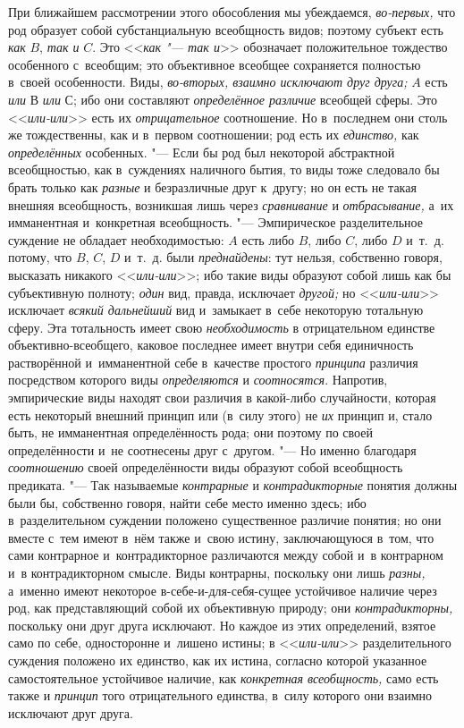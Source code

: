 При ближайшем рассмотрении этого обособления мы убеждаемся,
{\em во-первых,} что род
образует собой субстанциальную всеобщность видов; поэтому субъект есть
{\em как} $B$, {\em так и} $C$. Это <<{\em как "--- так и}>>
обозначает положительное тождество особенного с~всеобщим; это
объективное всеобщее сохраняется полностью в~своей особенности. Виды,
{\em во-вторых, взаимно исключают друг друга;} $A$ есть
{\em или} $В$ {\em или} $С$; ибо они составляют {\em определённое
различие} всеобщей сферы. Это <<{\em или-или}>> есть их {\em отрицательное}
соотношение. Но в~последнем они столь же тождественны, как и
в~первом соотношении; род есть их {\em единство,} как {\em определённых}
особенных. "--- Если бы род был некоторой
абстрактной всеобщностью, как в~суждениях наличного бытия, то виды тоже
следовало бы брать только как {\em разные} и
безразличные друг к~другу; но он есть не такая внешняя всеобщность,
возникшая лишь через {\em сравнивание} и {\em отбрасывание,}
а~их имманентная и~конкретная всеобщность. "---
Эмпирическое разделительное суждение не обладает
необходимостью: $A$ есть либо $B$, либо $C$, либо $D$ и~т.~д.
потому, что $B$, $C$, $D$ и~т.~д. были {\em преднайдены}: тут
нельзя, собственно говоря, высказать никакого <<{\em или-или}>>; ибо
такие виды образуют собой лишь как бы субъективную полноту;
{\em один} вид, правда, исключает {\em другой;} но <<{\em или-или}>>
исключает {\em всякий дальнейший} вид и~замыкает в~себе некоторую
тотальную сферу. Эта тотальность имеет свою {\em необходимость} в
отрицательном единстве объективно-всеобщего, каковое последнее имеет внутри
себя единичность растворённой и~имманентной себе в~качестве простого
{\em принципа} различия посредством которого виды {\em определяются} и
{\em соотносятся}. Напротив, эмпирические виды находят свои различия в
какой-либо случайности, которая есть некоторый внешний принцип или (в~силу
этого) не {\em их} принцип и, стало быть, не имманентная определённость рода;
они поэтому по своей определённости и~не соотнесены друг с~другом. "---
Но именно благодаря {\em соотношению} своей
определённости виды образуют собой всеобщность предиката. "--- Так называемые
{\em контрарные} и {\em контрадикторные}
понятия должны были бы, собственно говоря, найти себе место
именно здесь; ибо в~разделительном суждении положено существенное различие
понятия; но они вместе с~тем имеют в~нём также и~свою истину, заключающуюся
в~том, что сами контрарное и~контрадикторное различаются между собой и~в
контрарном и~в контрадикторном смысле. Виды контрарны, поскольку они лишь
{\em разны,} а~именно
имеют некоторое в-себе-и-для-себя-сущее устойчивое наличие через род, как
представляющий собой их объективную природу; они {\em контрадикторны,}
поскольку они друг друга исключают. Но каждое из этих
определений, взятое само по себе, односторонне и~лишено истины; в
<<{\em или-или}>>
разделительного суждения положено их единство, как их истина,
согласно которой указанное самостоятельное устойчивое наличие, как
{\em конкретная всеобщность,} само есть также и {\em принцип} того
отрицательного единства, в~силу которого они взаимно исключают друг друга.

